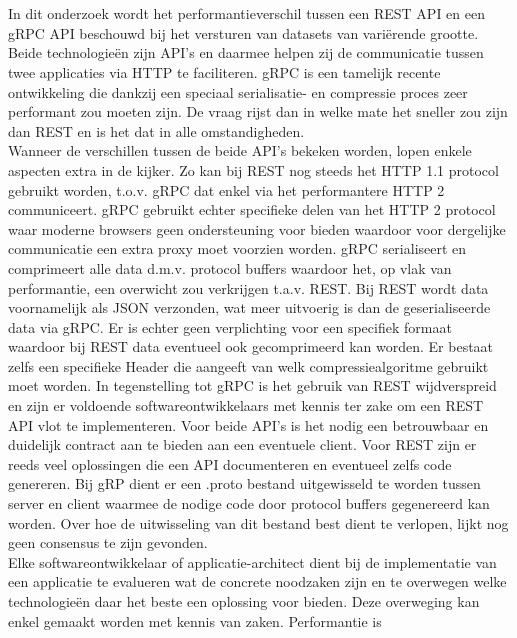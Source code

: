 \chapter*{}
In dit onderzoek wordt het performantieverschil tussen een REST API en een gRPC API beschouwd bij het versturen van datasets van vari\"erende grootte.
Beide technologie\"en zijn API's en daarmee helpen zij de communicatie tussen twee applicaties via HTTP te faciliteren. gRPC is een tamelijk recente ontwikkeling die
dankzij een speciaal serialisatie- en compressie proces zeer performant zou moeten zijn. De vraag rijst dan in welke mate het sneller zou zijn dan REST en is het dat
in alle omstandigheden.\\
Wanneer de verschillen tussen de beide API's bekeken worden, lopen enkele aspecten extra in de kijker.
Zo kan bij REST nog steeds het HTTP 1.1 protocol gebruikt worden, t.o.v. gRPC dat enkel via het performantere HTTP 2 communiceert.
gRPC gebruikt echter specifieke delen van het HTTP 2 protocol waar moderne browsers geen ondersteuning voor bieden
waardoor voor dergelijke communicatie een extra proxy moet voorzien worden.
gRPC serialiseert en comprimeert alle data d.m.v. protocol buffers waardoor het, op vlak van performantie, een overwicht zou verkrijgen t.a.v. REST.
Bij REST wordt data voornamelijk als JSON verzonden, wat meer uitvoerig is dan de geserialiseerde data via gRPC.
Er is echter geen verplichting voor een specifiek formaat waardoor bij REST data eventueel ook gecomprimeerd kan worden.
Er bestaat zelfs een specifieke Header die aangeeft van welk compressiealgoritme gebruikt moet worden.
In tegenstelling tot gRPC is het gebruik van REST wijdverspreid en zijn er voldoende softwareontwikkelaars met kennis ter zake om een REST API vlot te implementeren.
Voor beide API's is het nodig een betrouwbaar en duidelijk contract aan te bieden aan een eventuele client.
Voor REST zijn er reeds veel oplossingen die een API documenteren en eventueel zelfs code genereren.
Bij gRP dient er een .proto bestand uitgewisseld te worden tussen server en client waarmee de nodige code door protocol buffers gegenereerd kan worden.
Over hoe de uitwisseling van dit bestand best dient te verlopen, lijkt nog geen consensus te zijn gevonden.\\
Elke softwareontwikkelaar of applicatie-architect dient bij de implementatie van een applicatie te evalueren wat de concrete noodzaken
zijn en te overwegen welke technologie\"en daar het beste een oplossing voor bieden. Deze overweging kan enkel gemaakt worden met kennis van zaken. Performantie is
